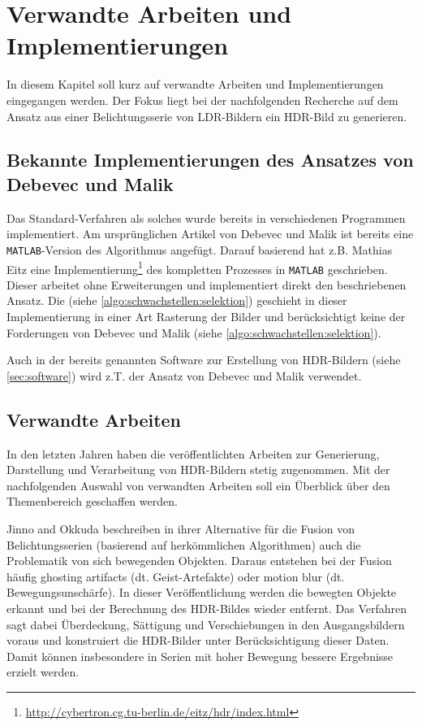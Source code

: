 \chapter{Verwandte Arbeiten und Implementierungen}
\label{chap:references}

In diesem Kapitel soll kurz auf verwandte Arbeiten und Implementierungen eingegangen werden. Der Fokus liegt bei der nachfolgenden Recherche auf dem Ansatz aus einer Belichtungsserie von \gls{LDR}-Bildern ein \gls{HDR}-Bild zu generieren.

\section{Bekannte Implementierungen des Ansatzes von Debevec und Malik}
\label{sec:implementations}
Das Standard-Verfahren als solches wurde bereits in verschiedenen Programmen implementiert. Am ursprünglichen Artikel von Debevec und Malik ist bereits eine \texttt{MATLAB}-Version des Algorithmus angefügt. 
Darauf basierend hat z.B. Mathias Eitz eine Implementierung\footnote{\url{http://cybertron.cg.tu-berlin.de/eitz/hdr/index.html}} des kompletten Prozesses in \texttt{MATLAB} geschrieben. Dieser arbeitet ohne Erweiterungen und implementiert direkt den beschriebenen Ansatz. Die  (siehe \autoref{algo:schwachstellen:selektion}) geschieht in dieser Implementierung in einer Art Rasterung der Bilder und berücksichtigt keine der Forderungen von Debevec und Malik (siehe \autoref{algo:schwachstellen:selektion}). 

Auch in der bereits genannten Software zur Erstellung von \gls{HDR}-Bildern (siehe \autoref{sec:software}) wird z.T. der Ansatz von Debevec und Malik verwendet.


\section{Verwandte Arbeiten}

In den letzten Jahren haben die veröffentlichten Arbeiten zur Generierung, Darstellung und Verarbeitung von \gls{HDR}-Bildern stetig zugenommen. Mit der nachfolgenden Auswahl von verwandten Arbeiten soll ein Überblick über den Themenbereich geschaffen werden.

Jinno and Okkuda \cite{Jinno} beschreiben in ihrer Alternative für die Fusion von Belichtungsserien (basierend auf herkömmlichen Algorithmen) auch die Problematik von sich bewegenden Objekten. Daraus entstehen bei der Fusion häufig ghosting artifacts (dt. Geist-Artefakte) oder motion blur (dt. Bewegungsunschärfe). In dieser Veröffentlichung werden die bewegten Objekte erkannt und bei der Berechnung des \gls{HDR}-Bildes wieder entfernt. Das Verfahren sagt dabei Überdeckung, Sättigung und Verschiebungen in den Ausgangsbildern voraus und konstruiert die \gls{HDR}-Bilder unter Berücksichtigung dieser Daten. Damit können insbesondere in Serien mit hoher Bewegung bessere Ergebnisse erzielt werden.

